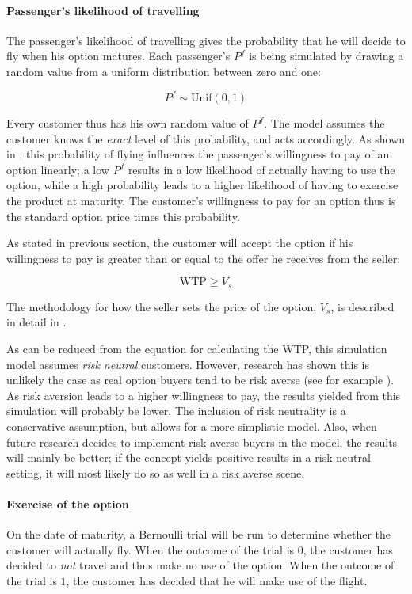 \paragraph{Passenger's likelihood of travelling}
The passenger's likelihood of travelling gives the probability that he will decide to fly when his option matures. Each passenger's $P^f$ is being simulated by drawing a random value from a uniform distribution between zero and one:

$$ P^f \sim \mbox{Unif}(0, 1)$$

Every customer thus has his own random value of $P^f$. The model assumes the customer knows the \emph{exact} level of this probability, and acts accordingly. As shown in , this probability of flying influences the passenger's willingness to pay of an option linearly; a low $P^f$ results in a low likelihood of actually having to use the option, while a high probability leads to a higher likelihood of having to exercise the product at maturity. The customer's willingness to pay for an option thus is the standard option price times this probability.

As stated in previous section, the customer will accept the option if his willingness to pay is greater than or equal to the offer he receives from the seller:

$$ \mbox{WTP} \ge V_s $$

The methodology for how the seller sets the price of the option, $V_s$, is described in detail in .

As can be reduced from the equation for calculating the WTP, this simulation model assumes \emph{risk neutral} customers. However, research has shown this is unlikely the case as real option buyers tend to be risk averse (see for example \cite{miller2004empirical}). As risk aversion leads to a higher willingness to pay, the results yielded from this simulation will probably be lower. The inclusion of risk neutrality is a conservative assumption, but allows for a more simplistic model. Also, when future research decides to implement risk averse buyers in the model, the results will mainly be better; if the concept yields positive results in a risk neutral setting, it will most likely do so as well in a risk averse scene.

\paragraph{Exercise of the option}
On the date of maturity, a Bernoulli trial will be run to determine whether the customer will actually fly. When the outcome of the trial is $0$, the customer has decided to \emph{not} travel and thus make no use of the option. When the outcome of the trial is $1$, the customer has decided that he will make use of the flight.


